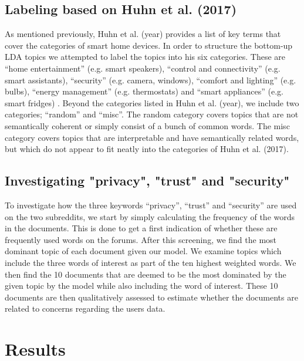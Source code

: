 \documentclass{article}
\begin{document}
    \subsection{Labeling based on Huhn et al. (2017)}
    As mentioned previously, Huhn et al. (year) provides a list of key terms that cover the categories of smart home devices. In order to structure the bottom-up LDA topics we attempted to label the topics into his six categories. These are “home entertainment” (e.g. smart speakers), “control and connectivity” (e.g. smart assistants), “security” (e.g. camera, windows), “comfort and lighting” (e.g. bulbs), “energy management” (e.g. thermostats) and “smart appliances” (e.g. smart fridges) \cite[p. 1]{hubert2020take}. Beyond the categories listed in Huhn et al. (year), we include two categories; “random” and “misc”. The random category covers topics that are not semantically coherent or simply consist of a bunch of common words. The misc category covers topics that are interpretable and have semantically related words, but which do not appear to fit neatly into the categories of Huhn et al. (2017).  
    
    \subsection{Investigating "privacy", "trust" and "security"}
    To investigate how the three keywords “privacy”, “trust” and “security” are used on the two subreddits, we start by simply calculating the frequency of the words in the documents. This is done to get a first indication of whether these are frequently used words on the forums. After this screening, we find the most dominant topic of each document given our model. We examine topics which include the three words of interest as part of the ten highest weighted words. We then find the 10 documents that are deemed to be the most dominated by the given topic by the model while also including the word of interest. These 10 documents are then qualitatively assessed to estimate whether the documents are related to concerns regarding the users data. 
    \section{Results}
\end{document}
